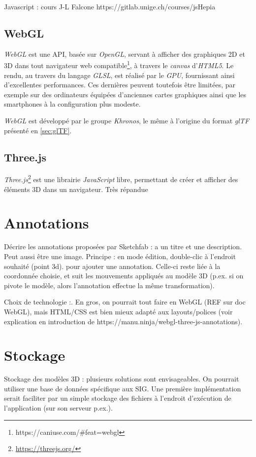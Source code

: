 Javascript : cours J-L Falcone https://gitlab.unige.ch/courses/jsHepia

\subsection{WebGL}
\textit{WebGL} est une API, basée sur \textit{OpenGL}, servant à afficher des graphiques 2D et 3D dans tout navigateur web compatible\footnote{https://caniuse.com/#feat=webgl}, à travers le \textit{canvas} d'\textit{HTML5}. 
Le rendu, au travers du langage \textit{GLSL}, est réalisé par le \textit{GPU}, fournissant ainsi d'excellentes performances. Ces dernières peuvent toutefois être limitées, par exemple sur des ordinateurs équipées d'anciennes cartes graphiques ainsi que les smartphones à la configuration plus modeste.

\textit{WebGL} est développé par le groupe \textit{Khronos}, le même à l'origine du format \textit{glTF} présenté en \ref{sec:glTF}.


\subsection{Three.js}
\textit{Three.js}\footnote{\url{https://threejs.org/}} est une librairie \textit{JavaScript} libre, permettant de créer et afficher des éléments 3D dans un navigateur. Très répandue




\section{Annotations}


Décrire les annotations proposées par Sketchfab : a un titre et une description. Peut aussi être une image.
Principe : en mode édition, double-clic à l'endroit souhaité (point 3d). pour ajouter une annotation. Celle-ci reste liée à la coordonnée choisie, et suit les mouvements appliqués au modèle 3D (p.ex. si on pivote le modèle, alors l'annotation effectue la même transformation).

Choix de technologie :. En gros, on pourrait tout faire en WebGL (REF sur doc WebGL), mais HTML/CSS est bien mieux adapté aux layouts/polices (voir explication en introduction de https://manu.ninja/webgl-three-js-annotations).

\section{Stockage}
Stockage des modèles 3D :
plusieurs solutions sont envisageables. On pourrait utiliser une base de données spécifique aux SIG.
Une première implémentation serait faciliter par un simple stockage des fichiers à l'endroit d'exécution de l'application (sur son serveur p.ex.).


